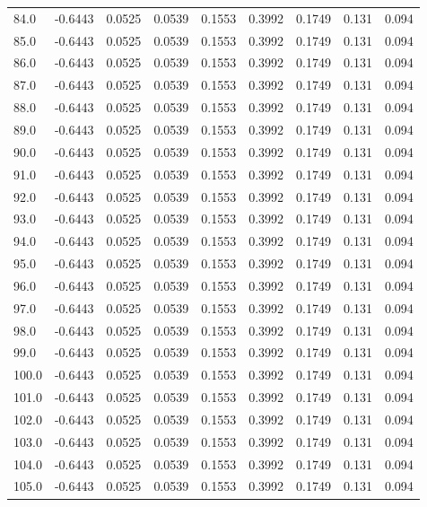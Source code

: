 \begin{longtable}{lrrrrrrrr}
84.0 & -0.6443 & 0.0525 & 0.0539 & 0.1553 & 0.3992 & 0.1749 & 0.131 & 0.094 \\
85.0 & -0.6443 & 0.0525 & 0.0539 & 0.1553 & 0.3992 & 0.1749 & 0.131 & 0.094 \\
86.0 & -0.6443 & 0.0525 & 0.0539 & 0.1553 & 0.3992 & 0.1749 & 0.131 & 0.094 \\
87.0 & -0.6443 & 0.0525 & 0.0539 & 0.1553 & 0.3992 & 0.1749 & 0.131 & 0.094 \\
88.0 & -0.6443 & 0.0525 & 0.0539 & 0.1553 & 0.3992 & 0.1749 & 0.131 & 0.094 \\
89.0 & -0.6443 & 0.0525 & 0.0539 & 0.1553 & 0.3992 & 0.1749 & 0.131 & 0.094 \\
90.0 & -0.6443 & 0.0525 & 0.0539 & 0.1553 & 0.3992 & 0.1749 & 0.131 & 0.094 \\
91.0 & -0.6443 & 0.0525 & 0.0539 & 0.1553 & 0.3992 & 0.1749 & 0.131 & 0.094 \\
92.0 & -0.6443 & 0.0525 & 0.0539 & 0.1553 & 0.3992 & 0.1749 & 0.131 & 0.094 \\
93.0 & -0.6443 & 0.0525 & 0.0539 & 0.1553 & 0.3992 & 0.1749 & 0.131 & 0.094 \\
94.0 & -0.6443 & 0.0525 & 0.0539 & 0.1553 & 0.3992 & 0.1749 & 0.131 & 0.094 \\
95.0 & -0.6443 & 0.0525 & 0.0539 & 0.1553 & 0.3992 & 0.1749 & 0.131 & 0.094 \\
96.0 & -0.6443 & 0.0525 & 0.0539 & 0.1553 & 0.3992 & 0.1749 & 0.131 & 0.094 \\
97.0 & -0.6443 & 0.0525 & 0.0539 & 0.1553 & 0.3992 & 0.1749 & 0.131 & 0.094 \\
98.0 & -0.6443 & 0.0525 & 0.0539 & 0.1553 & 0.3992 & 0.1749 & 0.131 & 0.094 \\
99.0 & -0.6443 & 0.0525 & 0.0539 & 0.1553 & 0.3992 & 0.1749 & 0.131 & 0.094 \\
100.0 & -0.6443 & 0.0525 & 0.0539 & 0.1553 & 0.3992 & 0.1749 & 0.131 & 0.094 \\
101.0 & -0.6443 & 0.0525 & 0.0539 & 0.1553 & 0.3992 & 0.1749 & 0.131 & 0.094 \\
102.0 & -0.6443 & 0.0525 & 0.0539 & 0.1553 & 0.3992 & 0.1749 & 0.131 & 0.094 \\
103.0 & -0.6443 & 0.0525 & 0.0539 & 0.1553 & 0.3992 & 0.1749 & 0.131 & 0.094 \\
104.0 & -0.6443 & 0.0525 & 0.0539 & 0.1553 & 0.3992 & 0.1749 & 0.131 & 0.094 \\
105.0 & -0.6443 & 0.0525 & 0.0539 & 0.1553 & 0.3992 & 0.1749 & 0.131 & 0.094 \\

\end{longtable}
